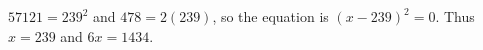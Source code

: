 $57121=239^2$ and $478=2(239)$, so the equation is $(x-239)^2=0$. Thus $x=239$ and $\boxed{6x=1434}$.
